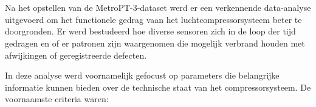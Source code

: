 
\newpage

\section{}%
\label{sec: Trendanalyse van de gekozen MetroPT-3-dataset}

Na het opstellen van de MetroPT-3-dataset werd er een verkennende data-analyse uitgevoerd om het functionele gedrag vaan het luchtcompressorsysteem beter te doorgronden. Er werd bestudeerd hoe diverse sensoren zich in de loop der tijd gedragen en of er patronen zijn waargenomen die mogelijk verbrand houden met afwijkingen of geregistreerde defecten.



In deze analyse werd voornamelijk gefocust op parameters die belangrijke informatie kunnen bieden over de technische staat van het compressorsysteem. De voornaamste criteria waren:

